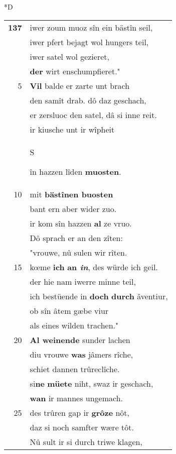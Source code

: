 \documentclass[8pt,a4paper,notitlepage]{article}
\begin{document}
\begin{table}[ht]
\begin{minipage}[t]{0.5\linewidth}
\small
\begin{center}*D
\end{center}
\begin{tabular}{rl}
\textbf{137} & iwer zoum muoz sîn ein bästîn seil,\\ 
 & iwer pfert bejagt wol hungers teil,\\ 
 & iwer satel wol gezieret,\\ 
 & \textbf{der} wirt enschumpfieret."\\ 
5 & \textbf{Vil} balde er zarte unt brach\\ 
 & den samît drab. dô daz geschach,\\ 
 & er zersluoc den satel, dâ si inne reit.\\ 
 & ir kiusche unt ir wîpheit\\ 
 & \begin{large}S\end{large}în hazzen lîden \textbf{muosten}.\\ 
10 & mit \textbf{bästînen buosten}\\ 
 & bant ern aber wider zuo.\\ 
 & ir kom sîn hazzen \textbf{al} ze vruo.\\ 
 & Dô sprach er an den zîten:\\ 
 & "vrouwe, nû sulen wir rîten.\\ 
15 & kœme \textbf{ich} \textbf{an \textit{in}}, des würde ich geil.\\ 
 & der hie nam iwerre minne teil,\\ 
 & ich bestüende in \textbf{doch} \textbf{durch} âventiur,\\ 
 & ob sîn âtem gæbe viur\\ 
 & als eines wilden trachen."\\ 
20 & \textbf{Al weinende} sunder lachen\\ 
 & diu vrouwe \textbf{was} jâmers rîche,\\ 
 & schiet dannen trûreclîche.\\ 
 & si\textbf{ne} \textbf{müete} niht, swaz ir geschach,\\ 
 & \textbf{wan} ir mannes ungemach.\\ 
25 & des trûren gap ir \textbf{grôze} nôt,\\ 
 & daz si noch samfter wære tôt.\\ 
 & Nû sult ir si durch triwe klagen,\\ 

\end{tabular}
\end{minipage}
\end{table}
\end{document}
